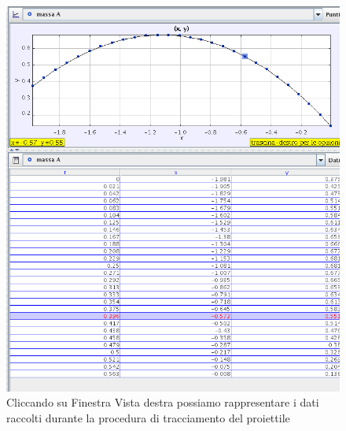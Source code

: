 \documentclass[a4paper,10pt,oneside]{article}
\begin{document}
\begin{figure}[H]
 \centering
 \includegraphics[width=0.5\textheight]{./immagini/tracker_grafico_traiettoria.png}
 \caption{Cliccando su Finestra \RIGHTarrow Vista destra possiamo rappresentare i dati raccolti durante la procedura di tracciamento del proiettile}
 \label{fig:grafico_traiettoria}
\end{figure}
\end{document}
